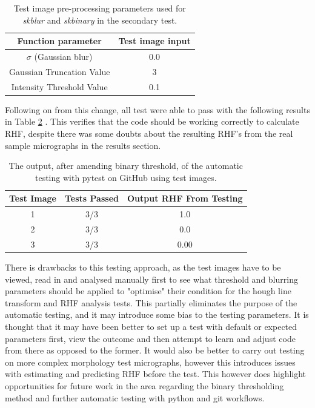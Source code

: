 \documentclass{article}
\begin{document}
    \begin{table}[h]
        \centering
        \begin{tabular}{|c|c|}
        \hline
            \textbf{Function parameter} & \textbf{Test image input}  \\
            \hline
            $\sigma$ (Gaussian blur) & 0.0 \\
            \hline
            Gaussian Truncation Value & 3 \\
            \hline
            Intensity Threshold Value & 0.1 \\ 
        \hline
        \end{tabular}
    \caption{Test image pre-processing parameters used for \textit{skblur} and \textit{skbinary} in the secondary test.}
    \label{tab:TestImageTable2}
    \end{table}
    \noindent Following on from this change, all test were able to pass with the following results in Table \ref{TestResults2} . This verifies that the code should be working correctly to calculate RHF, despite there was some doubts about the resulting RHF's from the real sample micrographs in the results section.
    
    \begin{table}[h]
    \centering
    \begin{tabular}{|c|c|c|}
    \hline
        \textbf{Test Image} & \textbf{Tests Passed} & \textbf{Output RHF From Testing}  \\
        \hline
        1 & 3/3 & 1.0 \\
        \hline
        2 & 3/3 & 0.0 \\
        \hline
        3 & 3/3 & 0.00 \\
        \hline
    \end{tabular}
    \caption{The output, after amending binary threshold, of the automatic testing with pytest on GitHub using test images.}
    \label{TestResults2}
\end{table}
    
    \noindent There is drawbacks to this testing approach, as the test images have to be viewed, read in and analysed manually first to see what threshold and blurring parameters should be applied to "optimise" their condition for the hough line transform and RHF analysis tests. This partially eliminates the purpose of the automatic testing, and it may introduce some bias to the testing parameters. It is thought that it may have been better to set up a test with default or expected parameters first, view the outcome and then attempt to learn and adjust code from there as opposed to the former. It would also be better to carry out testing on more complex morphology test micrographs, however this introduces issues with estimating and predicting RHF before the test. This however does highlight opportunities for future work in the area regarding the binary thresholding method and further automatic testing with python and git workflows.
\end{document}
